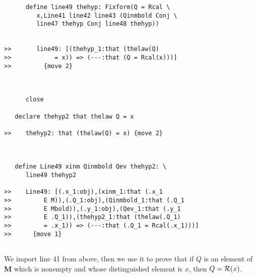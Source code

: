 \documentclass[12pt]{article}
\begin{document}
\begin{verbatim}
      define line49 thehyp: Fixform(Q = Rcal \
         x,Line41 line42 line43 (Qinmbold Conj \
         line47 thehyp Conj line48 thehyp))


>>       line49: [(thehyp_1:that (thelaw(Q)
>>            = x)) => (---:that (Q = Rcal(x)))]
>>         {move 2}



      close

   declare thehyp2 that thelaw Q = x

>>    thehyp2: that (thelaw(Q) = x) {move 2}



   define Line49 xinm Qinmbold Qev thehyp2: \
      line49 thehyp2

>>    Line49: [(.x_1:obj),(xinm_1:that (.x_1
>>         E M)),(.Q_1:obj),(Qinmbold_1:that (.Q_1
>>         E Mbold)),(.y_1:obj),(Qev_1:that (.y_1
>>         E .Q_1)),(thehyp2_1:that (thelaw(.Q_1)
>>         = .x_1)) => (---:that (.Q_1 = Rcal(.x_1)))]
>>      {move 1}


\end{verbatim}

We import line 41 from above, then we use it to prove that if $Q$ is an element of {\bf M} which is nonempty and whose distinguished element is $x$,
then $Q = {\cal R}(x)$.
\end{document}
